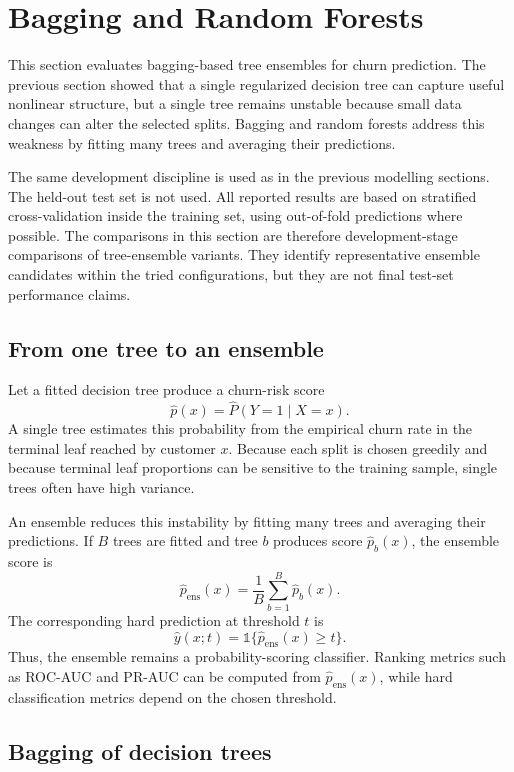 \newpage
\section{Bagging and Random Forests}
\label{sec:bagging-and-random-forests}

This section evaluates bagging-based tree ensembles for churn prediction. The previous section showed that a single regularized decision tree can capture useful nonlinear structure, but a single tree remains unstable because small data changes can alter the selected splits. Bagging and random forests address this weakness by fitting many trees and averaging their predictions.

The same development discipline is used as in the previous modelling sections. The held-out test set is not used. All reported results are based on stratified cross-validation inside the training set, using out-of-fold predictions where possible. The comparisons in this section are therefore development-stage comparisons of tree-ensemble variants. They identify representative ensemble candidates within the tried configurations, but they are not final test-set performance claims.

\subsection{From one tree to an ensemble}

Let a fitted decision tree produce a churn-risk score
\[
\widehat{p}(x)
=
\widehat{P}(Y=1\mid X=x).
\]
A single tree estimates this probability from the empirical churn rate in the terminal leaf reached by customer \(x\). Because each split is chosen greedily and because terminal leaf proportions can be sensitive to the training sample, single trees often have high variance.

An ensemble reduces this instability by fitting many trees and averaging their predictions. If \(B\) trees are fitted and tree \(b\) produces score \(\widehat{p}_b(x)\), the ensemble score is
\[
\widehat{p}_{\mathrm{ens}}(x)
=
\frac{1}{B}
\sum_{b=1}^{B}
\widehat{p}_b(x).
\]
The corresponding hard prediction at threshold \(t\) is
\[
\widehat{y}(x;t)
=
\mathbb{1}\{\widehat{p}_{\mathrm{ens}}(x)\geq t\}.
\]
Thus, the ensemble remains a probability-scoring classifier. Ranking metrics such as ROC-AUC and PR-AUC can be computed from \(\widehat{p}_{\mathrm{ens}}(x)\), while hard classification metrics depend on the chosen threshold.

\subsection{Bagging of decision trees}

